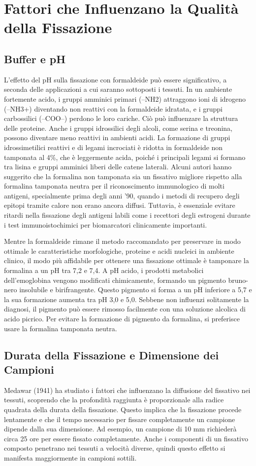 \section{Fattori che Influenzano la Qualità della Fissazione}
\subsection{Buffer e pH}
L'effetto del pH sulla fissazione con formaldeide può essere significativo, a seconda delle applicazioni a cui saranno sottoposti i tessuti. In un ambiente fortemente acido, i gruppi amminici primari (–NH2) attraggono ioni di idrogeno (–NH3+) diventando non reattivi con la formaldeide idratata, e i gruppi carbossilici (–COO--) perdono le loro cariche. Ciò può influenzare la struttura delle proteine. Anche i gruppi idrossilici degli alcoli, come serina e treonina, possono diventare meno reattivi in ambienti acidi. La formazione di gruppi idrossimetilici reattivi e di legami incrociati è ridotta in formaldeide non tamponata al 4\%, che è leggermente acida, poiché i principali legami si formano tra lisina e gruppi amminici liberi delle catene laterali. Alcuni autori hanno suggerito che la formalina non tamponata sia un fissativo migliore rispetto alla formalina tamponata neutra per il riconoscimento immunologico di molti antigeni, specialmente prima degli anni '90, quando i metodi di recupero degli epitopi tramite calore non erano ancora diffusi. Tuttavia, è essenziale evitare ritardi nella fissazione degli antigeni labili come i recettori degli estrogeni durante i test immunoistochimici per biomarcatori clinicamente importanti.

Mentre la formaldeide rimane il metodo raccomandato per preservare in modo ottimale le caratteristiche morfologiche, proteine e acidi nucleici in ambiente clinico, il modo più affidabile per ottenere una fissazione ottimale è tamponare la formalina a un pH tra 7,2 e 7,4. A pH acido, i prodotti metabolici dell'emoglobina vengono modificati chimicamente, formando un pigmento bruno-nero insolubile e birifrangente. Questo pigmento si forma a un pH inferiore a 5,7 e la sua formazione aumenta tra pH 3,0 e 5,0. Sebbene non influenzi solitamente la diagnosi, il pigmento può essere rimosso facilmente con una soluzione alcolica di acido picrico. Per evitare la formazione di pigmento da formalina, si preferisce usare la formalina tamponata neutra.

\subsection{Durata della Fissazione e Dimensione dei Campioni}
Medawar (1941) ha studiato i fattori che influenzano la diffusione del fissativo nei tessuti, scoprendo che la profondità raggiunta è proporzionale alla radice quadrata della durata della fissazione. Questo implica che la fissazione procede lentamente e che il tempo necessario per fissare completamente un campione dipende dalla sua dimensione. Ad esempio, un campione di 10 mm richiederà circa 25 ore per essere fissato completamente. Anche i componenti di un fissativo composto penetrano nei tessuti a velocità diverse, quindi questo effetto si manifesta maggiormente in campioni sottili.


